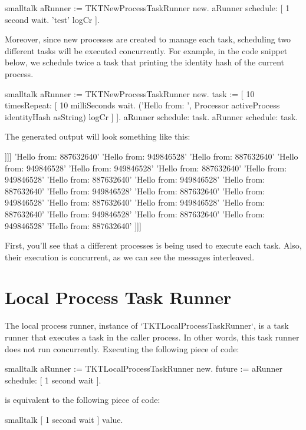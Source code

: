 \documentclass[10pt,twoside,english]{_support/latex/sbabook/sbabook}
\begin{document}
\begin{displaycode}{smalltalk}
aRunner := TKTNewProcessTaskRunner new.
aRunner schedule: [ 1 second wait. 'test' logCr ].
\end{displaycode}

Moreover, since new processes are created to manage each task, scheduling two different tasks will be executed concurrently. For example, in the code snippet below, we schedule twice a task that printing the identity hash of the current process.

\begin{displaycode}{smalltalk}
aRunner := TKTNewProcessTaskRunner new.
task := [ 10 timesRepeat: [ 10 milliSeconds wait.
				('Hello from: ', Processor activeProcess identityHash asString) logCr ] ].
aRunner schedule: task.
aRunner schedule: task.
\end{displaycode}

The generated output will look something like this:

{]}{]}{]}
'Hello from: 887632640'
'Hello from: 949846528'
'Hello from: 887632640'
'Hello from: 949846528'
'Hello from: 949846528'
'Hello from: 887632640'
'Hello from: 949846528'
'Hello from: 887632640'
'Hello from: 949846528'
'Hello from: 887632640'
'Hello from: 949846528'
'Hello from: 887632640'
'Hello from: 949846528'
'Hello from: 887632640'
'Hello from: 949846528'
'Hello from: 887632640'
'Hello from: 949846528'
'Hello from: 887632640'
'Hello from: 949846528'
'Hello from: 887632640'
{]}{]}{]}

First, you'll see that a different processes is being used to execute each task. Also, their execution is concurrent, as we can see the messages interleaved.
\section{Local Process Task Runner}
The local process runner, instance of `TKTLocalProcessTaskRunner`, is a task runner that executes a task in the caller process. In other words, this task runner does not run concurrently. Executing the following piece of code:

\begin{displaycode}{smalltalk}
aRunner := TKTLocalProcessTaskRunner new.
future := aRunner schedule: [ 1 second wait ].
\end{displaycode}

is equivalent to the following piece of code:

\begin{displaycode}{smalltalk}
[ 1 second wait ] value.
\end{displaycode}
\end{document}
